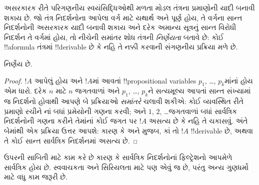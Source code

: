 \documentclass[../../../include/open-logic-section]{subfiles}
\begin{document}

અસરકારક રીતે પરિગણનીય સ્વયંસિદ્ધિઓથી મળતા મોડલ તંત્રના
પ્રમાણોની યાદી બનાવી શકાય છે. જો તંત્ર નિદર્શનોના આપેલા વર્ગ માટે
યથાર્થ અને પૂર્ણ હોય, તે વર્ગના સાન્ત નિદર્શનોની અસરકારક યાદી
બનાવી શકાય અને દરેક અમાન્ય સૂત્રનું સાન્ત વિરોધી નિદર્શન તે
વર્ગમાં હોય, તો નીચેની સમાંતર શોધ તંત્રની \emph{નિર્ણેયતા}
બતાવે છે: કોઈ !!a{formula} તંત્રમાં !!{derivable} છે કે નહિ
તે નક્કી કરવાની સંગણનીય પ્રક્રિયા મળે છે.


\begin{thm}
   નિર્ણેય છે.
\end{thm}

\begin{proof}
  $!A$ આપેલું હોય અને $!A$માં આવતાં !!{propositional variable}s
  $p_1$, \dots, $p_k$માંનાં હોય એમ ધારો. દરેક $n$ માટે $n$ જગતવાળાં
  અને $p_1$, \dots, $p_k$ને સત્યમૂલ્ય આપતાં સાન્ત સંખ્યામાં જ નિદર્શનો
  હોવાથી આપણે બે પ્રક્રિયાઓ \emph{સમાંતરે} ચલાવી શકીએ: કોઈ વ્યવસ્થિત
  રીતે પ્રમાણો રચીને નાં બધાં પ્રમેયોની ગણના કરવી; અને
  $1$, $2$, \dots જગતવાળાં બધાં સાર્વત્રિક નિદર્શનોની ગણના કરીને
  તેમાંનાં કોઈ જગત પર $!A$ અસત્ય છે કે નહિ તે ચકાસવું.
  અંતે બેમાંથી એક પ્રક્રિયા ઉત્તર આપશે: કારણ કે
   અને  મુજબ,
  કાં તો $!A$ !!{derivable} છે, અથવા તે કોઈ સાન્ત સાર્વત્રિક
  નિદર્શનમાં અસત્ય છે.
\end{proof}

ઉપરની સાબિતી  માટે કામ કરે છે કારણ કે સાર્વત્રિક
નિદર્શનોનાં ફિલ્ટ્રેશનો આપમેળે સાર્વત્રિક હોય છે. સ્વવાચકતા અને
સિરિયલતા માટે પણ એવું જ છે, પરંતુ અન્ય ગુણધર્મો માટે વધુ કામ
જરૂરી છે.
\end{document}
